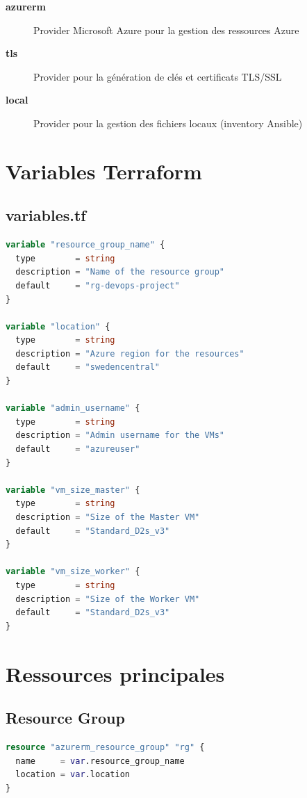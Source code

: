 \documentclass[12pt,a4paper,twoside]{report}
\begin{document}
\begin{description}
    \item[\textbf{azurerm}] Provider Microsoft Azure pour la gestion des ressources Azure
    \item[\textbf{tls}] Provider pour la génération de clés et certificats TLS/SSL
    \item[\textbf{local}] Provider pour la gestion des fichiers locaux (inventory Ansible)
\end{description}

\section{Variables Terraform}

\subsection{variables.tf}

\begin{lstlisting}[language=terraform]
variable "resource_group_name" {
  type        = string
  description = "Name of the resource group"
  default     = "rg-devops-project"
}

variable "location" {
  type        = string
  description = "Azure region for the resources"
  default     = "swedencentral"
}

variable "admin_username" {
  type        = string
  description = "Admin username for the VMs"
  default     = "azureuser"
}

variable "vm_size_master" {
  type        = string
  description = "Size of the Master VM"
  default     = "Standard_D2s_v3"
}

variable "vm_size_worker" {
  type        = string
  description = "Size of the Worker VM"
  default     = "Standard_D2s_v3"
}
\end{lstlisting}

\section{Ressources principales}

\subsection{Resource Group}

\begin{lstlisting}[language=terraform]
resource "azurerm_resource_group" "rg" {
  name     = var.resource_group_name
  location = var.location
}
\end{lstlisting}
\end{document}
